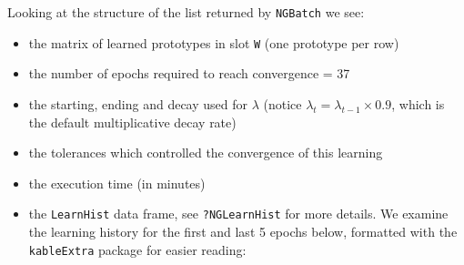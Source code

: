 \documentclass[11pt,]{article}
\newenvironment{Shaded}{}{}
\newcommand{\CommentTok}[1]{\textcolor[rgb]{0.00,0.50,0.00}{#1}}
\newcommand{\DataTypeTok}[1]{#1}
\newcommand{\DecValTok}[1]{#1}
\newcommand{\KeywordTok}[1]{\textcolor[rgb]{0.00,0.00,1.00}{#1}}
\newcommand{\NormalTok}[1]{#1}
\newcommand{\OperatorTok}[1]{#1}
\newcommand{\StringTok}[1]{\textcolor[rgb]{0.00,0.50,0.50}{#1}}
\providecommand{\tightlist}{%
\setlength{\itemsep}{0pt}\setlength{\parskip}{0pt}}
\begin{document}
Looking at the structure of the list returned by \texttt{NGBatch} we
see:

\begin{itemize}
\tightlist
\item
  the matrix of learned prototypes in slot \texttt{W} (one prototype per
  row)
\item
  the number of epochs required to reach convergence = 37
\item
  the starting, ending and decay used for \(\lambda\) (notice
  \(\lambda_t = \lambda_{t-1} \times 0.9\), which is the default
  multiplicative decay rate)
\item
  the tolerances which controlled the convergence of this learning
\item
  the execution time (in minutes)
\item
  the \texttt{LearnHist} data frame, see \texttt{?NGLearnHist} for more
  details. We examine the learning history for the first and last 5
  epochs below, formatted with the \texttt{kableExtra} package for
  easier reading:
\end{itemize}

\begin{Shaded}
\end{Shaded}
\end{document}
